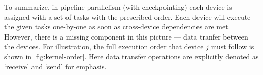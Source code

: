 To summarize, in pipeline parallelism (with checkpointing) each device is assigned with a set of tasks with the prescribed order. Each device will execute the given tasks one-by-one as soon as cross-device dependencies are met. However, there is a missing component in this picture --- data tranfer between the devices. For illustration, the full execution order that device $j$ must follow is shown in \autoref{fig:kernel-order}. Here data transfer operations are explicitly denoted as `receive' and `send' for emphasis.

